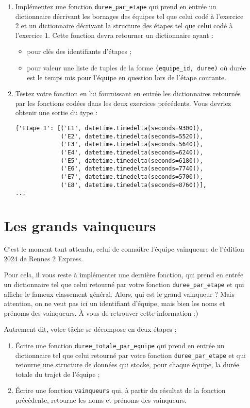 \documentclass[11pt,a4paper]{article}
\begin{document}
\begin{enumerate}
    \item Implémentez une fonction \texttt{duree\_par\_etape} qui prend en entrée un dictionnaire décrivant les bornages des équipes tel que celui codé à l'exercice 2 et un dictionnaire décrivant la structure des étapes tel que celui codé à l'exercice 1.
    Cette fonction devra retourner un dictionnaire ayant :
    \begin{itemize}
        \item pour clés des identifiants d'étapes ;
        \item pour valeur une liste de tuples de la forme \texttt{(equipe\_id, duree)} où durée est le temps mis pour l'équipe en question lors de l'étape courante.
    \end{itemize}
    \item Testez votre fonction en lui fournissant en entrée les dictionnaires retournés par les fonctions codées dans les deux exercices précédents. Vous devriez obtenir une sortie du type :
    \begin{verbatim}
{'Etape 1': [('E1', datetime.timedelta(seconds=9300)),
             ('E2', datetime.timedelta(seconds=5520)),
             ('E3', datetime.timedelta(seconds=5640)),
             ('E4', datetime.timedelta(seconds=6240)),
             ('E5', datetime.timedelta(seconds=6180)),
             ('E6', datetime.timedelta(seconds=7740)),
             ('E7', datetime.timedelta(seconds=5700)),
             ('E8', datetime.timedelta(seconds=8760))],
...
    \end{verbatim}
\end{enumerate}

\section{Les grands vainqueurs}

C'est le moment tant attendu, celui de connaître l'équipe vainqueure de l'édition 2024 de Rennes 2 Express.

Pour cela, il vous reste à implémenter une dernière fonction, qui prend en entrée un dictionnaire tel que celui retourné par votre fonction \texttt{duree\_par\_etape} et qui affiche le fameux classement général.
Alors, qui est le grand vainqueur ?
Mais attention, on ne veut pas ici un identifiant d'équipe, mais bien les noms et prénoms des vainqueurs. À vous de retrouver cette information :)

Autrement dit, votre tâche se décompose en deux étapes :
\begin{enumerate}
    \item Écrire une fonction \texttt{duree\_totale\_par\_equipe} qui prend en entrée un dictionnaire tel que celui retourné par votre fonction \texttt{duree\_par\_etape} et qui retourne une structure de données qui stocke, pour chaque équipe, la durée totale du trajet de l'équipe ;
    \item Écrire une fonction \texttt{vainqueurs} qui, à partir du résultat de la fonction précédente, retourne les noms et prénoms des vainqueurs.
\end{enumerate}
\end{document}
